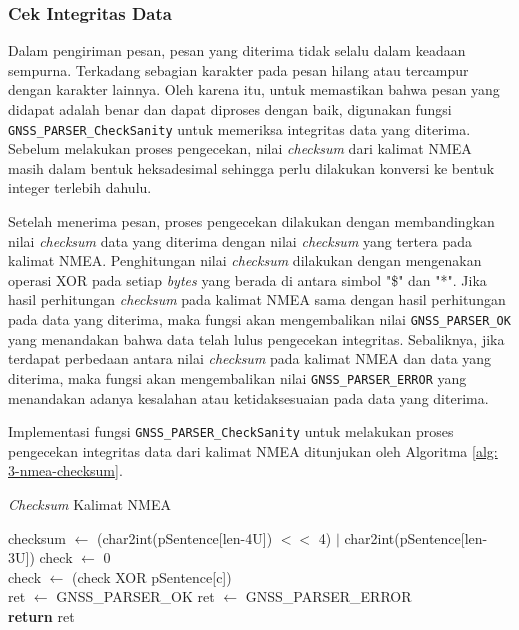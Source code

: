 \subsubsection{Cek Integritas Data}
Dalam pengiriman pesan, pesan yang diterima tidak selalu dalam keadaan sempurna. Terkadang sebagian karakter pada pesan hilang atau tercampur dengan karakter lainnya. Oleh karena itu, untuk memastikan bahwa pesan yang didapat adalah benar dan dapat diproses dengan baik, digunakan fungsi \texttt{GNSS\_PARSER\_CheckSanity} untuk memeriksa integritas data yang diterima. Sebelum melakukan proses pengecekan, nilai \textit{checksum} dari kalimat NMEA masih dalam bentuk heksadesimal sehingga perlu dilakukan konversi ke bentuk integer terlebih dahulu.

Setelah menerima pesan, proses pengecekan dilakukan dengan membandingkan nilai \textit{checksum} data yang diterima dengan nilai \textit{checksum} yang tertera pada kalimat NMEA. Penghitungan nilai \textit{checksum} dilakukan dengan mengenakan operasi XOR pada setiap \textit{bytes} yang berada di antara simbol "\$" dan "*". Jika hasil perhitungan \textit{checksum} pada kalimat NMEA sama dengan hasil perhitungan pada data yang diterima, maka fungsi akan mengembalikan nilai \texttt{GNSS\_PARSER\_OK} yang menandakan bahwa data telah lulus pengecekan integritas. Sebaliknya, jika terdapat perbedaan antara nilai \textit{checksum} pada kalimat NMEA dan data yang diterima, maka fungsi akan mengembalikan nilai \texttt{GNSS\_PARSER\_ERROR} yang menandakan adanya kesalahan atau ketidaksesuaian pada data yang diterima.

Implementasi fungsi \texttt{GNSS\_PARSER\_CheckSanity} untuk melakukan proses pengecekan integritas data dari kalimat NMEA ditunjukan oleh Algoritma \ref{alg: 3-nmea-checksum}.

\begin{algorithm}
	\caption{\textit{Checksum} Kalimat NMEA}
	\label{alg: 3-nmea-checksum}
	\begin{algorithmic}[1]
	\State checksum $\gets$ (char2int(pSentence[len-4U]) $<<$ 4) $|$ char2int(pSentence[len-3U])
	\State check $\gets$ 0
	\\
		\State check $\gets$ (check XOR pSentence[c])
	\EndFor
	\\
		\State ret $\gets$ GNSS\_PARSER\_OK
	\Else
		\State ret $\gets$ GNSS\_PARSER\_ERROR
	\EndIf
	\\
	\State \textbf{return} ret			
	\end{algorithmic}
\end{algorithm}

